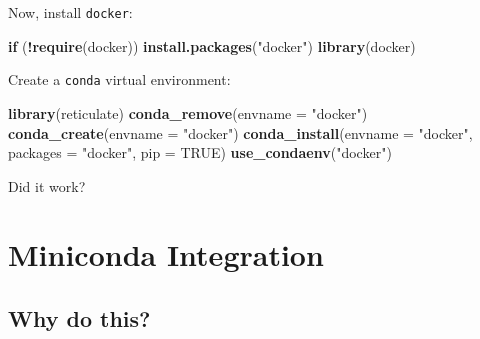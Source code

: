 \documentclass[]{book}
\newenvironment{Shaded}{\begin{snugshade}}{\end{snugshade}}
\newcommand{\ControlFlowTok}[1]{\textcolor[rgb]{0.13,0.29,0.53}{\textbf{#1}}}
\newcommand{\DataTypeTok}[1]{\textcolor[rgb]{0.13,0.29,0.53}{#1}}
\newcommand{\KeywordTok}[1]{\textcolor[rgb]{0.13,0.29,0.53}{\textbf{#1}}}
\newcommand{\NormalTok}[1]{#1}
\newcommand{\OperatorTok}[1]{\textcolor[rgb]{0.81,0.36,0.00}{\textbf{#1}}}
\newcommand{\OtherTok}[1]{\textcolor[rgb]{0.56,0.35,0.01}{#1}}
\newcommand{\StringTok}[1]{\textcolor[rgb]{0.31,0.60,0.02}{#1}}
\theoremstyle{definition}
\theoremstyle{definition}
\theoremstyle{definition}
\theoremstyle{remark}
\begin{document}
Now, install \texttt{docker}:

\begin{Shaded}
\begin{Highlighting}[]
\ControlFlowTok{if}\NormalTok{ (}\OperatorTok{!}\KeywordTok{require}\NormalTok{(docker)) }\KeywordTok{install.packages}\NormalTok{(}\StringTok{"docker"}\NormalTok{)}
\KeywordTok{library}\NormalTok{(docker)}
\end{Highlighting}
\end{Shaded}

Create a \texttt{conda} virtual environment:

\begin{Shaded}
\begin{Highlighting}[]
\KeywordTok{library}\NormalTok{(reticulate)}
\KeywordTok{conda_remove}\NormalTok{(}\DataTypeTok{envname =} \StringTok{"docker"}\NormalTok{)}
\KeywordTok{conda_create}\NormalTok{(}\DataTypeTok{envname =} \StringTok{"docker"}\NormalTok{)}
\KeywordTok{conda_install}\NormalTok{(}\DataTypeTok{envname =} \StringTok{"docker"}\NormalTok{, }\DataTypeTok{packages =} \StringTok{"docker"}\NormalTok{, }\DataTypeTok{pip =} \OtherTok{TRUE}\NormalTok{)}
\KeywordTok{use_condaenv}\NormalTok{(}\StringTok{"docker"}\NormalTok{)}
\end{Highlighting}
\end{Shaded}

Did it work?

\begin{Shaded}
\end{Shaded}

\hypertarget{miniconda-integration}{%
\chapter{Miniconda Integration}\label{miniconda-integration}}

\hypertarget{why-do-this}{%
\section{Why do this?}\label{why-do-this}}
\end{document}
